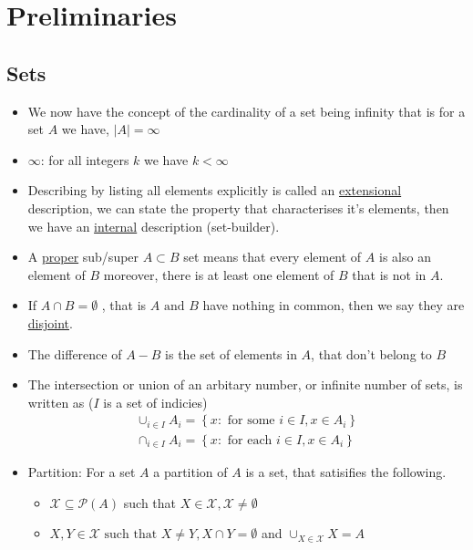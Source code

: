 \documentclass[11pt]{book}
\begin{document}

\chapter{Preliminaries}%
\label{chp:preliminaries}

\section{Sets}%
\label{sec:sets}

\begin{itemize}
    \item We now have the concept of the cardinality of a set being infinity that is for a set $A$ we have, $\left| A \right| = \infty $
    \item $\infty $: for all integers $k$ we have $k < \infty $ 
    \item Describing by listing all elements explicitly is called an \underline{extensional}  description, we can state the property that characterises it's elements, then we have an \underline{internal} description (set-builder).
    \item A \underline{proper}  sub/super $A \subset B$ set means that every element of $A$ is also an element of $B$ moreover, there is at least one element of $B$ that is not in $A$.   
    \item If $A \cap  B = \emptyset  $ , that is $A \text{ and } B$ have nothing in common, then we say they are \underline{disjoint}.
    \item The difference of $A - B$ is the set of elements in $A$, that don't belong to $B$ 
    \item The intersection or union of an arbitary number, or infinite number of sets, is written as ($I$ is a set of indicies)
        \begin{gather*}
            \cup _{i \in I} A_{i} = \left\{ x: \text{ for some } i\in I, x \in A_{i}  \right\} \\
            \cap  _{i \in I} A_{i} = \left\{ x: \text{ for each } i\in I, x \in A_{i}  \right\} 
        \end{gather*}
    \item Partition: For a set $A$ a partition of $A$ is a set, that satisifies the following.
        \begin{itemize}
            \item $\mathcal{X} \subseteq \mathcal{P}(A) $ such that $X \in \mathcal{X}, \mathcal{X} \neq \emptyset $ 
        \item $X,Y \in \mathcal{X} \text{ such that } X\neq Y, X\cap Y= \emptyset $ and $\cup _{X\in \mathcal{X} } X= A$ 
        \end{itemize}
\end{itemize}
\end{document}
